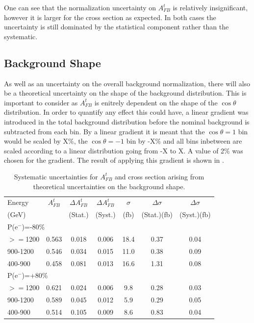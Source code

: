 One can see that the normalization uncertainty on $A_{FB}^t$ is relatively insignificant, however it is larger for the cross section as expected. In both cases the uncertainty is still dominated by the statistical component rather than the systematic.

\subsection{Background Shape}

As well as an uncertainty on the overall background normalization, there will also be a theoretical uncertainty on the shape of the background distribution. This is important to consider as $A_{FB}^t$ is enitrely dependent on the shape of the $\cos\theta$ distribution. In order to quantify any effect this could have, a linear gradient was introduced in the total background distribution before the nominal background is subtracted from each bin. By a linear gradient it is meant that the $\cos\theta=1$ bin would be scaled by X\%, the $\cos\theta=-1$ bin by -X\% and all bins inbetween are scaled according to a linear distribution going from -X to X. A value of 2\% was chosen for the gradient. The result of applying this gradient is shown in .

\begin{table}
  \centering
  \begin{tabular}{l|c|c|c|c|c|c}
    \toprule
     Energy & $A_{FB}^t$ & $\Delta A_{FB}^t$  & $\Delta A^t_{FB}$ &  $\sigma$  &  $\Delta\sigma$  &  $\Delta\sigma$ \\
     (GeV) &  & (Stat.) & (Syst.) &  (fb) &  (Stat.)(fb) &  (Syst.)(fb)\\
     \midrule
     \midrule
     \multicolumn{7}{l}{P(e$^-$)=-80\%} \\
     \midrule
     \midrule
    $>=$1200   & 0.563 & 0.018 & 0.006 & 18.4 & 0.37 & 0.04\\
    \midrule
    900-1200   & 0.546 & 0.034 & 0.015 & 11.0 & 0.38 & 0.09\\
    \midrule
    400-900    & 0.458 & 0.081 & 0.013 & 16.6 & 1.31 & 0.08\\
    \midrule
    \midrule
   \multicolumn{7}{l}{ P(e$^-$)=+80\%}\\
    \midrule
    \midrule
    $>=$1200  & 0.621 & 0.024 & 0.006 & 9.8 & 0.28 & 0.03 \\
    \midrule
    900-1200  & 0.589 & 0.045 & 0.012 & 5.9 & 0.29 & 0.05 \\
    \midrule
    400-900   & 0.514 & 0.105 & 0.009 & 8.6 & 0.83 & 0.04 \\
    \bottomrule
  \end{tabular}
  \caption{Systematic uncertainties for $A_{FB}^t$ and cross section arising from theoretical uncertainties on the background shape.}
  \label{tab:bkggrad}
\end{table}

